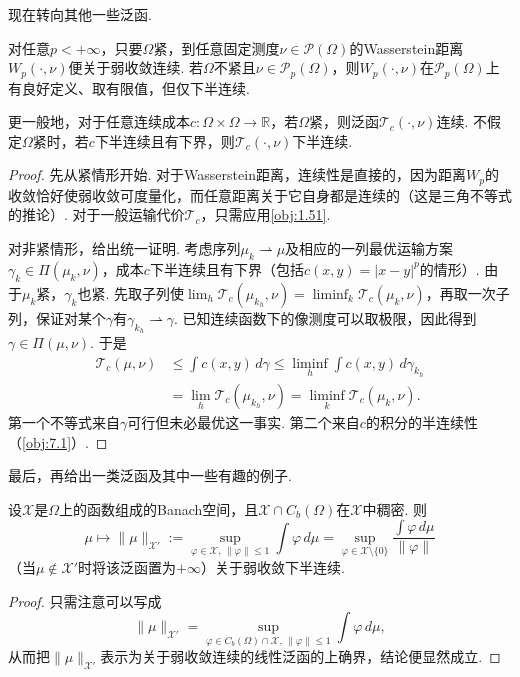 现在转向其他一些泛函.
\begin{proposition}\label{obj:7.4}
对任意$p<+\infty$，只要$\Omega$紧，到任意固定测度$\nu\in\mathscr P(\Omega)$的Wasserstein距离$W_p(\cdot,\nu)$便关于弱收敛连续. 若$\Omega$不紧且$\nu\in\mathscr P_p(\Omega)$，则$W_p(\cdot,\nu)$在$\mathscr P_p(\Omega)$上有良好定义、取有限值，但仅下半连续.

更一般地，对于任意连续成本$c:\Omega\times\Omega\to\mathbb R$，若$\Omega$紧，则泛函$\mathscr T_c(\cdot,\nu)$连续. 不假定$\Omega$紧时，若$c$下半连续且有下界，则$\mathscr T_c(\cdot,\nu)$下半连续.
\end{proposition}
\begin{proof}
先从紧情形开始. 对于Wasserstein距离，连续性是直接的，因为距离$W_p$的收敛恰好使弱收敛可度量化，而任意距离关于它自身都是连续的（这是三角不等式的推论）. 对于一般运输代价$\mathscr T_c$，只需应用\autoref{obj:1.51}.

对非紧情形，给出统一证明. 考虑序列$\mu_k\rightharpoonup\mu$及相应的一列最优运输方案$\gamma_k\in\Pi(\mu_k,\nu)$，成本$c$下半连续且有下界（包括$c(x,y)=|x-y|^p$的情形）. 由于$\mu_k$紧，$\gamma_k$也紧. 先取子列使$\lim_h\mathscr T_c(\mu_{k_h},\nu)=\liminf_k\mathscr T_c(\mu_k,\nu)$，再取一次子列，保证对某个$\gamma$有$\gamma_{k_h}\rightharpoonup\gamma$. 已知连续函数下的像测度可以取极限，因此得到$\gamma\in\Pi(\mu,\nu)$. 于是
\[
\begin{aligned}
 \mathscr T_c(\mu,\nu)&\leq\int c(x,y)\,d\gamma
 \leq\liminf_h\int c(x,y)\,d\gamma_{k_h}\\
 &=\lim_h\mathscr T_c(\mu_{k_h},\nu)
 =\liminf_k\mathscr T_c(\mu_k,\nu).
\end{aligned}
\]
第一个不等式来自$\gamma$可行但未必最优这一事实. 第二个来自$c$的积分的半连续性（\autoref{obj:7.1}）.
\end{proof}
最后，再给出一类泛函及其中一些有趣的例子.
\begin{proposition}\label{obj:7.5}
设$\mathscr X$是$\Omega$上的函数组成的Banach空间，且$\mathscr X\cap C_b(\Omega)$在$\mathscr X$中稠密. 则
\[
 \mu\mapsto\|\mu\|_{\mathscr X'}:=
 \sup_{\varphi\in\mathscr X,\,\|\varphi\|\leq1}\int\varphi\,d\mu
 =\sup_{\varphi\in\mathscr X\setminus\{0\}}
                   \frac{\int\varphi\,d\mu}{\|\varphi\|}
\]
（当$\mu\notin\mathscr X'$时将该泛函置为$+\infty$）关于弱收敛下半连续.
\end{proposition}
\begin{proof}
只需注意可以写成
\[
 \|\mu\|_{\mathscr X'}=
 \sup_{\varphi\in C_b(\Omega)\cap\mathscr X,\,\|\varphi\|\leq1}
              \int\varphi\,d\mu,
\]
从而把$\|\mu\|_{\mathscr X'}$表示为关于弱收敛连续的线性泛函的上确界，结论便显然成立.
\end{proof}
